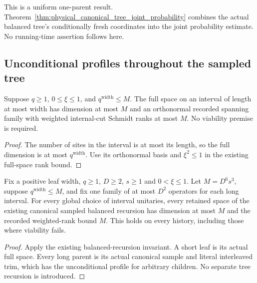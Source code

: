 This is a uniform one-parent result. Theorem~\ref{thm:physical_canonical_tree_joint_probability}
combines the actual balanced tree's conditionally fresh coordinates into
the joint probability estimate. No running-time assertion follows here.

\subsection{Unconditional profiles throughout the sampled tree}

\begin{lemma}
    \label{lem:full_short_interval_dimension_rank_bounds}
    \leanok
    Suppose $q\ge1$, $0\le\xi\le1$, and $q^{\mathrm{width}}\le M$.
    The full space on an interval of length at most $\mathrm{width}$ has
    dimension at most $M$ and an orthonormal recorded spanning family with
    weighted internal-cut Schmidt ranks at most $M$. No viability premise
    is required.
\end{lemma}
\begin{proof}\leanok
    The number of sites in the interval is at most its length, so the
    full dimension is at most $q^{\mathrm{width}}$. Use its orthonormal
    basis and $\xi^2\le1$ in the existing full-space rank bound.
\end{proof}

\begin{lemma}
    \label{lem:canonical_sampled_tree_unconditional_profile}
    \leanok
    Fix a positive leaf width, $q\ge1$, $D\ge2$, $s\ge1$ and
    $0<\xi\le1$. Let $M=D^6s^3$, suppose $q^{\mathrm{width}}\le M$,
    and fix one family of at most $D^2$ operators for each long interval.
    For every global choice of interval unitaries, every retained space
    of the existing canonical sampled balanced recursion has dimension at
    most $M$ and the recorded weighted-rank bound $M$.
    This holds on every history, including those where viability fails.
\end{lemma}
\begin{proof}\leanok
    Apply the existing balanced-recursion invariant. A short leaf is its
    actual full space. Every long parent is its actual canonical sample
    and literal interleaved trim, which has the unconditional profile for
    arbitrary children. No separate tree recursion is introduced.
\end{proof}

